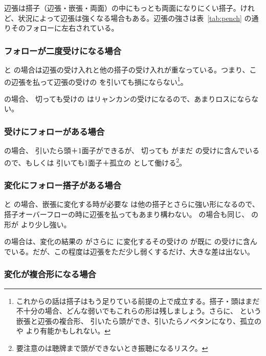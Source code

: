 \documentclass[10pt, twocolumn]{article}
\newlength\stdbls %
\newcommand{\mjfn}[1]{\raisebox{-.135\stdbls}{\mahjong[0.75\stdbls]{#1}}}
\begin{document}
辺張は搭子（辺張・嵌張・両面）の中にもっとも両面になりにくい搭子。けれど、状況によって辺張は強くなる場合もある。辺張の強さは表~\ref{tab:pench} の通りそのフォローに左右されている\citep{gendai-penchan}。


\subsubsection*{フォローが二度受けになる場合}

 と  の場合は辺張の受け入れと他の搭子の受け入れが重なっている。つまり、この辺張を払って辺張の受けの  を引いても損にならない\footnote{これからの話は搭子はもう足りている前提の上で成立する。搭子・頭はまだ不十分の場合、どんな弱いでもこれらの形は残しましょう。さらに、\mjfn{124m} という嵌張と辺張の複合形、\mjfn{1m} 引いたら頭ができ、\mjfn{3m}引いたらノベタンになり、孤立の \mjfn{1m} や \mjfn{2m} より有能かもしれない。}。

 の場合、 切っても受けの  はリャンカンの受けになるので、あまりロスにならない。

\subsubsection*{受けにフォローがある場合}

 の場合、 引いたら頭＋1面子ができるが、 切っても  がまだ  の受けに含んでいるので、もしくは  引いても1面子＋孤立の  として働ける\footnote{要注意のは聴牌まで頭ができないとき振聴になるリスク。}。


\subsubsection*{変化にフォロー搭子がある場合}

 と  の場合、嵌張に変化する時が必要な  は他の搭子とさらに強い形になるので、搭子オーバーフローの時に辺張を払ってもあまり構わない。 の場合も同じ、 の形が  より少し強い。

 の場合は、変化の結果の  がさらに  に変化するその受けの  が既に  の受けに含んでいる。だが、この程度は辺張をただ少し弱くするだけ、大きな差は出ない。


\subsubsection*{変化が複合形になる場合}
\end{document}
